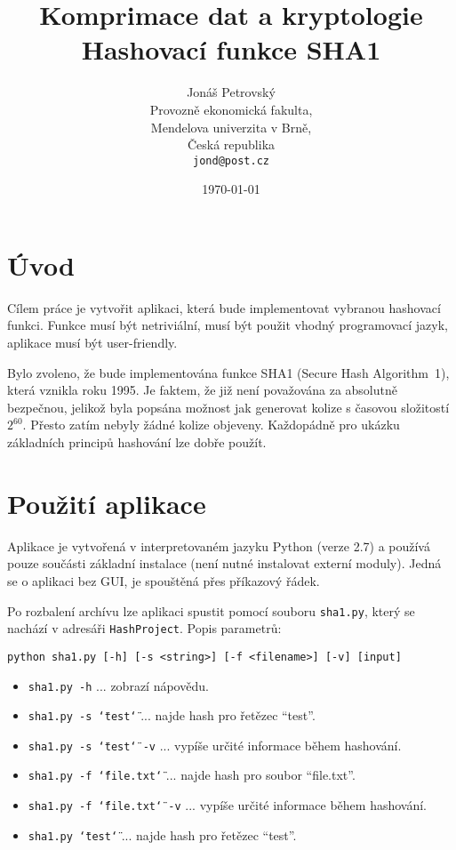 \documentclass[a4paper]{article}
\begin{document}
\title{\vspace{-2.0cm}Komprimace dat a kryptologie \\ \textbf{Hashovací funkce SHA1}}
\author{Jonáš Petrovský\\
        Provozně ekonomická fakulta,\\
		Mendelova univerzita v Brně,\\
		Česká republika \\
		\texttt{jond@post.cz}}
\date{\today}
\maketitle

\newcommand{\dqtt}[1]{\texttt{\char`\"}#1\texttt{\char`\"}}

\section{Úvod}
Cílem práce je vytvořit aplikaci, která bude implementovat vybranou hashovací funkci. Funkce musí být netriviální, musí být použit vhodný programovací jazyk, aplikace musí být user-friendly.

Bylo zvoleno, že bude implementována funkce SHA1 (Secure Hash Algorithm~1), která vznikla roku 1995. Je faktem, že již není považována za absolutně bezpečnou, jelikož byla popsána možnost jak generovat kolize s časovou složitostí $2^{60}$. Přesto zatím nebyly žádné kolize objeveny. Každopádně pro ukázku základních principů hashování lze dobře použít.

\section{Použití aplikace}
Aplikace je vytvořená v interpretovaném jazyku Python (verze 2.7) a používá pouze součásti základní instalace (není nutné instalovat externí moduly). Jedná se o aplikaci bez GUI, je spouštěná přes příkazový řádek. 

Po rozbalení archívu lze aplikaci spustit pomocí souboru \texttt{sha1.py}, který se nachází v adresáři \texttt{HashProject}. Popis parametrů:

\begin{verbatim}
python sha1.py [-h] [-s <string>] [-f <filename>] [-v] [input]
\end{verbatim}

\begin{itemize}
\item \texttt{sha1.py -h} ... zobrazí nápovědu.
\item \texttt{sha1.py -s \dqtt{test}} ... najde hash pro řetězec ``test''.
\item \texttt{sha1.py -s \dqtt{test} -v} ... vypíše určité informace během hashování.
\item \texttt{sha1.py -f  \dqtt{file.txt}} ... najde hash pro soubor ``file.txt''.
\item \texttt{sha1.py -f  \dqtt{file.txt} -v} ... vypíše určité informace během hashování.
\item \texttt{sha1.py \dqtt{test}} ... najde hash pro řetězec ``test''.
\end{itemize}
\end{document}
